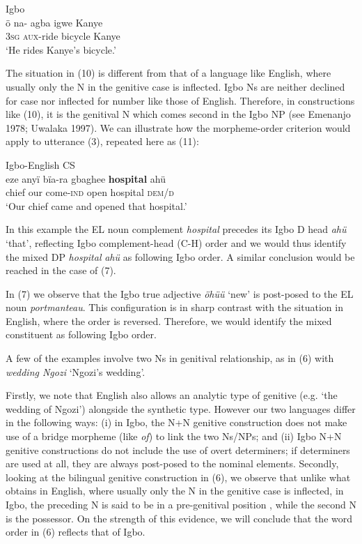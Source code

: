 \documentclass[output=paper]{langsci/langscibook}
\begin{document}
\ea
{Igbo}\\
\gll ö    na- agba  \textsubscript{ }igwe    Kanye\\
     \textsc{3sg}    \textsc{aux}{}-ride  bicycle    Kanye\\
\glt ‘He rides Kanye’s bicycle.’
\z

The situation in (10) is different from that of a language like English, where usually only the N in the genitive case is inflected. Igbo Ns are neither declined for case nor inflected for number like those of English. Therefore, in constructions like (10), it is the genitival N which comes second in the Igbo NP (see Emenanjo 1978; Uwalaka 1997). We can illustrate how the morpheme-order criterion would apply to utterance (3), repeated here as (11):

\ea
{Igbo-English CS}\\
\gll eze    anyï  bïa-ra        gbaghee  \textbf{hospital  }ahü \textbf{ }\\
     chief   our  come-\textsc{ind}  open        hospital    \textsc{dem/d}\\
\glt ‘Our chief came and opened that hospital.’
\z

In this example the EL noun complement \textit{hospital }precedes its Igbo D head \textit{ahü} ‘that’, reflecting Igbo complement-head (C-H) order and we would thus identify the mixed DP \textit{hospital}\textbf{\textit{ }}\textit{ahü} as following Igbo order. A similar conclusion would be reached in the case of (7).

In (7) we observe that the Igbo true adjective \textit{öhüü }‘new’ is post-posed to the EL noun \textit{portmanteau}. This configuration is in sharp contrast with the situation in English, where the order is reversed. Therefore, we would identify the mixed constituent as following Igbo order. 

A few of the examples involve two Ns in genitival relationship, as in (6) with \textit{wedding Ngozi }‘Ngozi’s wedding’. 

Firstly, we note that English also allows an analytic type of genitive (e.g. ‘the wedding of Ngozi’) alongside the synthetic type. However our two languages differ in the following ways: (i) in Igbo, the N+N genitive construction does not make use of a bridge morpheme (like \textit{of}) to link the two Ns/NPs; and (ii) Igbo N+N genitive constructions do not include the use of overt determiners; if determiners are used at all, they are always post-posed to the nominal elements. Secondly, looking at the bilingual genitive construction in (6), we observe that unlike what obtains in English, where usually only the N in the genitive case is inflected, in Igbo, the preceding N is said to be in a pre-genitival position \citep{Uwalaka1997}, while the second N is the possessor. On the strength of this evidence, we will conclude that the word order in (6) reflects that of Igbo. 
\end{document}

